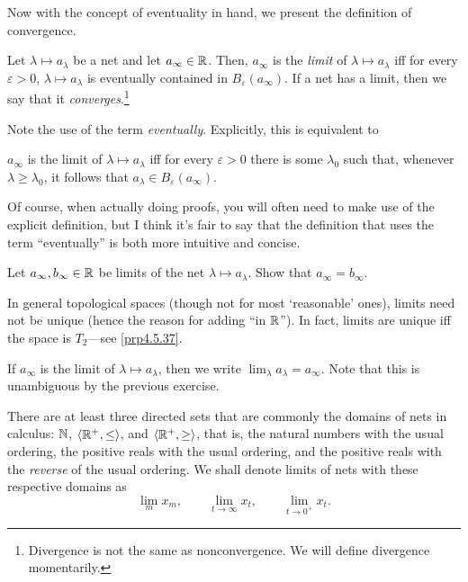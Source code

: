 Now with the concept of eventuality in hand, we present the definition of convergence.
\begin{dfn}\label{dfn3.3.8}
Let $\lambda \mapsto a_\lambda$ be a net and let $a_\infty\in \mathbb{R}$.  Then, $a_\infty$ is the \emph{limit} of $\lambda \mapsto a_\lambda$ iff for every $\varepsilon >0$, $\lambda \mapsto a_\lambda$ is eventually contained in $B_\varepsilon (a_\infty)$.   If a net has a limit, then we say that it \emph{converges}.\footnote{Divergence is not the same as nonconvergence.  We will define divergence momentarily.}
\begin{rmk}
Note the use of the term \emph{eventually}.  Explicitly, this is equivalent to
\begin{textequation}
$a_\infty$ is the limit of $\lambda \mapsto a_\lambda$ iff for every $\varepsilon >0$ there is some $\lambda _0$ such that, whenever $\lambda \geq \lambda _0$, it follows that $a_\lambda \in B_{\varepsilon}(a_\infty)$.
\end{textequation}
Of course, when actually doing proofs, you will often need to make use of the explicit definition, but I think it's fair to say that the definition that uses the term ``eventually'' is both more intuitive and concise.
\end{rmk}
\begin{exr}
Let $a_\infty,b_\infty\in \mathbb{R}$ be limits of the net $\lambda \mapsto a_\lambda$.  Show that $a_\infty=b_\infty$.
\begin{rmk}
In general topological spaces (though not for most `reasonable' ones), limits need not be unique (hence the reason for adding ``in $\mathbb{R}$'').  In fact, limits are unique iff the space is $T_2$---see \cref{prp4.5.37}.
\end{rmk}
\end{exr}
\begin{rmk}
If $a_\infty$ is the limit of $\lambda \mapsto a_\lambda$, then we write $\lim _\lambda a_\lambda =a_\infty$.  Note that this is unambiguous by the previous exercise.
\end{rmk}
\begin{rmk}
There are at least three directed sets that are commonly the domains of nets in calculus:  $\mathbb{N}$, $\langle\mathbb{R} ^+,\leq\rangle$, and $\langle\mathbb{R} ^+,\geq\rangle$, that is, the natural numbers with the usual ordering, the positive reals with the usual ordering, and the positive reals with the \emph{reverse} of the usual ordering.  We shall denote limits of nets with these respective domains as
\begin{equation}
\lim _mx_m,\qquad \lim _{t\to \infty}x_t,\qquad \lim _{t\to 0^+}x_t.
\end{equation}
\end{rmk}
\end{dfn}

